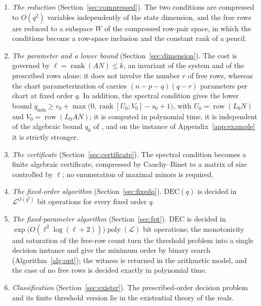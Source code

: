 \documentclass[journal]{IEEEtran}
\theoremstyle{plainn}
\theoremstyle{remark}
\begin{document}
\begin{enumerate}
\item \emph{The reduction} (Section~\ref{sec:compressed}). The two conditions are compressed to
$O(q^2)$ variables independently of the state dimension, and the free rows are reduced to a subspace
$W$ of the compressed row-pair space, in which the conditions become a row-space inclusion and the
constant rank of a pencil.
\item \emph{The parameter and a lower bound} (Section~\ref{sec:dimension}). The cost is governed by
$\ell=\operatorname{rank}(AN)\le k$, an invariant of the system and of the prescribed rows alone: it
does not involve the number $r$ of free rows, whereas the chart parameterization of \cite{fer26b}
carries $(n-p-q)(q-r)$ parameters per chart at fixed order $q$. In addition, the spectral condition
gives the lower bound
$q_{\min}\ge r_0+\max\bigl(0,\operatorname{rank}[U_0;V_0]-s_0+1\bigr)$, with
$U_0=\operatorname{row}(L_0N)$ and $V_0=\operatorname{row}(L_0AN)$; it is computed in polynomial time,
it is independent of the algebraic bound $q_0$ of \cite{fer26a,fer26b}, and on the instance of
Appendix~\ref{app:example} it is strictly stronger.
\item \emph{The certificate} (Section~\ref{sec:certificate}). The spectral condition becomes a finite
algebraic certificate, compressed by Cauchy--Binet to a matrix of size controlled by $\ell$; no
enumeration of maximal minors is required.
\item \emph{The fixed-order algorithm} (Section~\ref{sec:fixedq}). $\mathrm{DEC}(q)$ is decided in
$\mathcal L^{O(q^2)}$ bit operations for every fixed order $q$.
\item \emph{The fixed-parameter algorithm} (Section~\ref{sec:fpt}). $\mathrm{DEC}$ is decided in
$\exp\bigl(O(\ell^2\log(\ell+2))\bigr)\operatorname{poly}(\mathcal L)$ bit operations; the monotonicity
and saturation of the free-row count turn the threshold problem into a single decision instance and
give the minimum order by binary search (Algorithm~\ref{alg:opt}); the witness is returned in the
arithmetic model, and the case of no free rows is decided exactly in polynomial time.
\item \emph{Classification} (Section~\ref{sec:existsr}). The prescribed-order decision problem and its
finite threshold version lie in the existential theory of the reals.
\end{enumerate}
\end{document}
